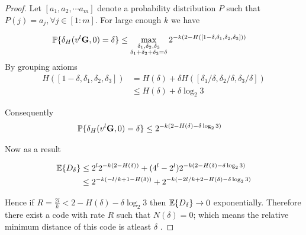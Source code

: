 \begin{proof}
 Let $[ a_1,a_2, \cdots a_m]$ denote a probability distribution $P$ such that $P(j)=a_j, \forall j\in [1:m]$. For large enough $k$ we have


\begin{align*}
\mathbb{P}\{ \delta_H(v^l\mathbf{G},0)&=\delta \}\leq \max_{\substack{\delta_1,\delta_2,\delta_3\\ \delta_1+\delta_2+\delta_3=\delta}} 2^{-k(2-H([1-\delta,\delta_1,\delta_2,\delta_3]))}
\end{align*}
By grouping axioms 
\begin{align*}
H([1-\delta,\delta_1,\delta_2,\delta_3])&= H(\delta)+\delta H([\delta_1/\delta,\delta_2/\delta,\delta_3/\delta])\\
&\leq   H(\delta)+\delta \log_2 3
\end{align*}

Consequently 
\begin{align*}
\mathbb{P}\{ \delta_H(v^l\mathbf{G},0)&=\delta \}\leq  2^{-k(2- H(\delta)-\delta \log_2 3)}
\end{align*}

Now as a result

\begin{align*}
\mathbb{E}\{ D_{\delta}\}&\leq 2^l 2^{-k(2-H(\delta))} + (4^l-2^l) 2^{-k(2- H(\delta)-\delta \log_2 3)}\\
& \leq  2^{-k(-l/k+1-H(\delta))} + 2^{-k(-2l/k+2- H(\delta)-\delta \log_2 3)}
\end{align*}

Hence if $R=\frac{2l}{k}< 2- H(\delta)-\delta \log_2 3$ then $\mathbb{E}\{ D_{\delta}\} \rightarrow 0$ exponentially. Therefore there exist a code with rate $R$ such that $N(\delta)=0$; which means the relative minimum distance of this code is atleast $\delta$ .

%
\end{proof}


